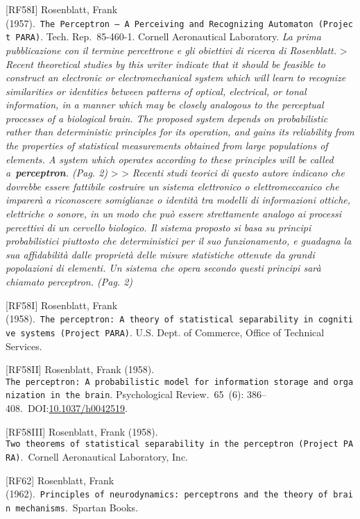 \documentclass[
  letterpaper,
  DIV=11,
  numbers=noendperiod]{scrreprt}
\begin{document}
{[}RF58I{]} Rosenblatt, Frank
(1957).~\texttt{The\ Perceptron\ —\ A\ Perceiving\ and\ Recognizing\ Automaton\ (Project\ PARA)}.
Tech. Rep.~85-460-1. Cornell Aeronautical Laboratory. \emph{La prima
pubblicazione con il termine percettrone e gli obiettivi di ricerca di
Rosenblatt.} \textgreater{} \emph{Recent theoretical studies by this
writer indicate that it should be feasible to construct an electronic or
electromechanical system which will learn to recognize similarities or
identities between patterns of optical, electrical, or tonal
information, in a manner which may be closely analogous to the
perceptual processes of a biological brain. The proposed system depends
on probabilistic rather than deterministic principles for its operation,
and gains its reliability from the properties of statistical
measurements obtained from large populations of elements. A system which
operates according to these principles will be called
a~\textbf{perceptron}. (Pag. 2)} \textgreater{} \textgreater{}
\emph{Recenti studi teorici di questo autore indicano che dovrebbe
essere fattibile costruire un sistema elettronico o elettromeccanico che
imparerà a riconoscere somiglianze o identità tra modelli di
informazioni ottiche, elettriche o sonore, in un modo che può essere
strettamente analogo ai processi percettivi di un cervello biologico. Il
sistema proposto si basa su principi probabilistici piuttosto che
deterministici per il suo funzionamento, e guadagna la sua affidabilità
dalle proprietà delle misure statistiche ottenute da grandi popolazioni
di elementi. Un sistema che opera secondo questi principi sarà chiamato
perceptron. (Pag. 2)}

{[}RF58I{]} Rosenblatt, Frank
(1958).~\texttt{The\ perceptron:\ A\ theory\ of\ statistical\ separability\ in\ cognitive\ systems\ (Project\ PARA)}.
U.S. Dept. of Commerce, Office of Technical Services.

{[}RF58II{]} Rosenblatt, Frank (1958).
\texttt{The\ perceptron:\ A\ probabilistic\ model\ for\ information\ storage\ and\ organization\ in\ the\ brain}.
Psychological Review.~65~(6):
386--408.~DOI:\href{https://doi.org/10.1037\%2Fh0042519}{10.1037/h0042519}.

{[}RF58III{]} Rosenblatt, Frank (1958).
\texttt{Two\ theorems\ of\ statistical\ separability\ in\ the\ perceptron\ (Project\ PARA)}.~Cornell
Aeronautical Laboratory, Inc.

{[}RF62{]} Rosenblatt, Frank
(1962).~\texttt{Principles\ of\ neurodynamics:\ perceptrons\ and\ the\ theory\ of\ brain\ mechanisms}.~Spartan
Books.
\end{document}
